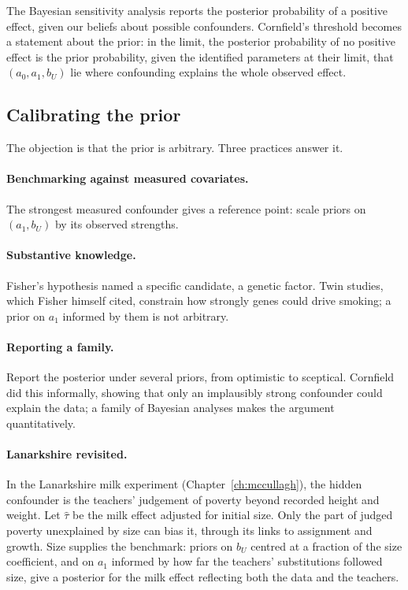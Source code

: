 The Bayesian sensitivity analysis reports the posterior probability of a positive effect, given our beliefs about possible confounders. Cornfield's threshold becomes a statement about the prior: in the limit, the posterior probability of no positive effect is the prior probability, given the identified parameters at their limit, that $(a_0, a_1, b_U)$ lie where confounding explains the whole observed effect.

\subsection{Calibrating the prior}

The objection is that the prior is arbitrary. Three practices answer it.

\paragraph{Benchmarking against measured covariates.} The strongest measured confounder gives a reference point: scale priors on $(a_1, b_U)$ by its observed strengths.

\paragraph{Substantive knowledge.} Fisher's hypothesis named a specific candidate, a genetic factor. Twin studies, which Fisher himself cited, constrain how strongly genes could drive smoking; a prior on $a_1$ informed by them is not arbitrary.

\paragraph{Reporting a family.} Report the posterior under several priors, from optimistic to sceptical. Cornfield did this informally, showing that only an implausibly strong confounder could explain the data; a family of Bayesian analyses makes the argument quantitatively.

\paragraph{Lanarkshire revisited.} In the Lanarkshire milk experiment (Chapter~\ref{ch:mccullagh}), the hidden confounder is the teachers' judgement of poverty beyond recorded height and weight. Let $\hat\tau$ be the milk effect adjusted for initial size. Only the part of judged poverty unexplained by size can bias it, through its links to assignment and growth. Size supplies the benchmark: priors on $b_U$ centred at a fraction of the size coefficient, and on $a_1$ informed by how far the teachers' substitutions followed size, give a posterior for the milk effect reflecting both the data and the teachers.

